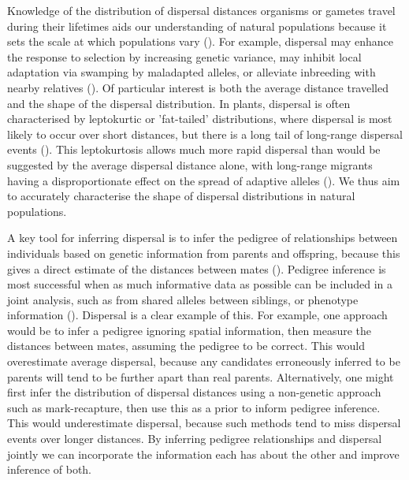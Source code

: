 \documentclass[10pt, a4paper, twocolumn]{article} %
\begin{document}
Knowledge of the distribution of dispersal distances organisms or gametes travel during their lifetimes aids our understanding of natural populations because it sets the scale at which populations vary (\cite{cain2000long}).
For example, dispersal may enhance the response to selection by increasing genetic variance, may inhibit local adaptation via swamping by maladapted alleles, or alleviate inbreeding with nearby relatives (\cite{kremer2012long}).
Of particular interest is both the average distance travelled and the shape of the dispersal distribution.
In plants, dispersal is often characterised by leptokurtic or 'fat-tailed' distributions, where dispersal is most likely to occur over short distances, but there is a long tail of long-range dispersal events (\cite{clark1998trees,austerlitz2004using,bullock2017synthesis}).
This leptokurtosis allows much more rapid dispersal than would be suggested by the average dispersal distance alone, with long-range migrants having a disproportionate effect on the spread of adaptive alleles (\cite{clark1998trees,cain2000long}).
We thus aim to accurately characterise the shape of dispersal distributions in natural populations.

A key tool for inferring dispersal is to infer the pedigree of relationships between individuals based on genetic information from parents and offspring, because this gives a direct estimate of the distances between mates (\cite{adams1992using, cain2000long, austerlitz2004using,pemberton2008wild}).
Pedigree inference is most successful when as much informative data as possible can be included in a joint analysis, such as from shared alleles between siblings, or phenotype information (\cite{neff2001bayesian, wang2007parentage}).
Dispersal is a clear example of this.
For example, one approach would be to infer a pedigree ignoring spatial information, then measure the distances between mates, assuming the pedigree to be correct.
This would overestimate average dispersal, because any candidates erroneously inferred to be parents will tend to be further apart than real parents.
Alternatively, one might first infer the distribution of dispersal distances using a non-genetic approach such as mark-recapture, then use this as a prior to inform pedigree inference.
This would underestimate dispersal, because such methods tend to miss dispersal events over longer distances.
By inferring pedigree relationships and dispersal jointly we can incorporate the information each has about the other and improve inference of both.
\end{document}
